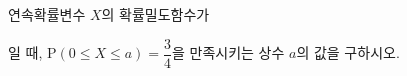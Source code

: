 연속확률변수 $X$의 확률밀도함수가 \par\smallskip{}\par\smallskip\noindent 일 때, $\mathrm{P}(0\le X\le a)=\dfrac{3}{4}$을 만족시키는 상수 $a$의 값을 구하시오.
